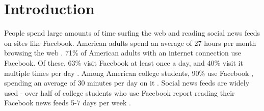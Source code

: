 \documentclass{sigchi}
\begin{document}
\begin{abstract}
\end{abstract}




\section{Introduction}


People spend large amounts of time surfing the web and reading social news feeds on sites like Facebook.
American adults spend an average of 27 hours per month browsing the web \cite{nielsen2014}.
71\% of American adults with an internet connection use Facebook. Of these, 63\% visit Facebook at least once a day, and 40\% visit it multiple times per day \cite{socialmediaupdate}. Among American college students, 90\% use Facebook \cite{collegefacebook2}, spending an average of 30 minutes per day on it \cite{collegefacebook}. Social news feeds are widely used - over half of college students who use Facebook report reading their Facebook news feeds 5-7 days per week \cite{collegefacebook}. %
\end{document}
